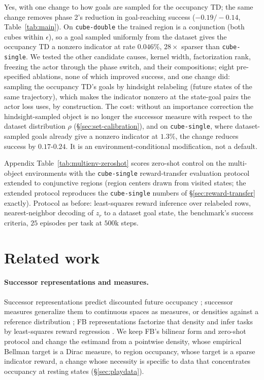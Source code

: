 \documentclass{article}
\begin{document}
Yes, with one change to how goals are sampled for the occupancy TD; the same change removes phase 2's reduction in goal-reaching success ($-0.19/-0.14$, Table~\ref{tab:main}).
On \texttt{cube-double} the trained region is a conjunction (both cubes within $\epsilon$), so a goal sampled uniformly from the dataset gives the occupancy TD a nonzero indicator at rate $0.046\%$, $28\times$ sparser than \texttt{cube-single}.
We tested the other candidate causes, kernel width, factorization rank, freezing the actor through the phase switch, and their compositions; eight pre-specified ablations, none of which improved success, and one change did: sampling the occupancy TD's goals by hindsight relabeling (future states of the same trajectory), which makes the indicator nonzero at the state-goal pairs the actor loss uses, by construction.
The cost: without an importance correction the hindsight-sampled object is no longer the successor measure with respect to the dataset distribution $\rho$ (\S\ref{sec:set-calibration}), and on \texttt{cube-single}, where dataset-sampled goals already give a nonzero indicator at $1.3\%$, the change reduces success by $0.17$-$0.24$.
It is an environment-conditional modification, not a default.

Appendix Table~\ref{tab:multienv-zeroshot} scores zero-shot control on the multi-object environments with the \texttt{cube-single} reward-transfer evaluation protocol extended to conjunctive regions (region centers drawn from visited states; the extended protocol reproduces the \texttt{cube-single} numbers of \S\ref{sec:reward-transfer} exactly).
Protocol as before: least-squares reward inference over relabeled rows, nearest-neighbor decoding of $z_r$ to a dataset goal state, the benchmark's success criteria, $25$ episodes per task at $500$k steps.

\section{Related work}
\label{sec:related}

\paragraph{Successor representations and measures.}
Successor representations predict discounted future occupancy \citep{dayan1993improving}; successor measures generalize them to continuous spaces as measures, or densities against a reference distribution \citep{blier2021learning}; FB representations factorize that density and infer tasks by least-squares reward regression \citep{touati2021learning,touati2023does}.
We keep FB's bilinear form and zero-shot protocol and change the estimand from a pointwise density, whose empirical Bellman target is a Dirac measure, to region occupancy, whose target is a sparse indicator reward, a change whose necessity is specific to data that concentrates occupancy at resting states (\S\ref{sec:playdata}).
\end{document}
